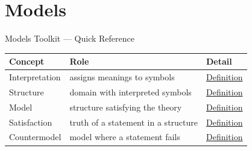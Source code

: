 \section{Models}

\begin{toolkitbox}{Models Toolkit --- Quick Reference}
\small
\begin{tabular}{l l l}
\toprule
\textbf{Concept} & \textbf{Role} & \textbf{Detail} \\
\midrule
Interpretation & assigns meanings to symbols & \hyperref[def:axiom-systems-interpretation]{Definition} \\
Structure & domain with interpreted symbols & \hyperref[def:axiom-systems-structure]{Definition} \\
Model & structure satisfying the theory & \hyperref[def:axiom-systems-model]{Definition} \\
Satisfaction & truth of a statement in a structure & \hyperref[def:axiom-systems-satisfaction]{Definition} \\
Countermodel & model where a statement fails & \hyperref[def:axiom-systems-countermodel]{Definition} \\
\bottomrule
\end{tabular}
\end{toolkitbox}


